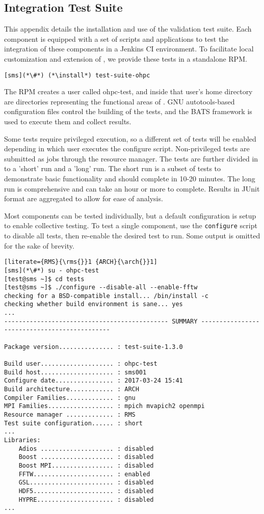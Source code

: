 \subsection{Integration Test Suite}  \label{appendix:test_suite}

This appendix details the installation and use of the \OHPC validation test
suite. Each \OHPC component is equipped with a set of scripts and applications
to test the integration of these components in a Jenkins CI 
environment. To facilitate local customization and extension of \OHPC, we 
provide these tests in a standalone RPM. 

\begin{lstlisting}
[sms](*\#*) (*\install*) test-suite-ohpc
\end{lstlisting}

The RPM creates a user called ohpc-test, and inside that user's home directory 
are directories representing the functional areas of \OHPC. GNU 
autotools-based configuration files control the building of the tests, and the
BATS framework is used to execute them and collect results. 

Some tests require privileged execution, so a different set of tests will be
enabled depending in which user executes the configure script. Non-privileged
tests are submitted as jobs through the \rms{} resource manager. The tests are
further divided in to a 'short' run and a 'long' run. The short run is a subset
of tests to demonstrate basic functionality and should complete in 10-20 
minutes. The long run is comprehensive and can take an hour or more to complete.
Results in JUnit format are aggregated to allow for ease of analysis.

Most components can be tested individually, but a default configuration is setup 
to enable collective testing. To test a single component, use the \texttt{configure}
script to disable all tests, then re-enable the desired test to run. Some output
is omitted for the sake of brevity.

\begin{lstlisting}[literate={RMS}{\rms{}}1 {ARCH}{\arch{}}1]
[sms](*\#*) su - ohpc-test
[test@sms ~]$ cd tests
[test@sms ~]$ ./configure --disable-all --enable-fftw
checking for a BSD-compatible install... /bin/install -c
checking whether build environment is sane... yes
...
--------------------------------------------- SUMMARY ---------------------------------------------

Package version............... : test-suite-1.3.0

Build user.................... : ohpc-test
Build host.................... : sms001
Configure date................ : 2017-03-24 15:41
Build architecture............ : ARCH
Compiler Families............. : gnu
MPI Families.................. : mpich mvapich2 openmpi
Resource manager ............. : RMS
Test suite configuration...... : short
...
Libraries:
    Adios .................... : disabled
    Boost .................... : disabled
    Boost MPI................. : disabled
    FFTW...................... : enabled
    GSL....................... : disabled
    HDF5...................... : disabled
    HYPRE..................... : disabled
...
\end{lstlisting}

